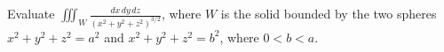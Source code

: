 Evaluate $\displaystyle \iiint_W \frac{dx\, dy\, dz}{(x^2 + y^2 + z^2)^{3/2}}$, where $W$ is the solid bounded by the two spheres $x^2 + y^2 + z^2 = a^2$ and $x^2 + y^2 + z^2 = b^2$, where $0 < b < a$.